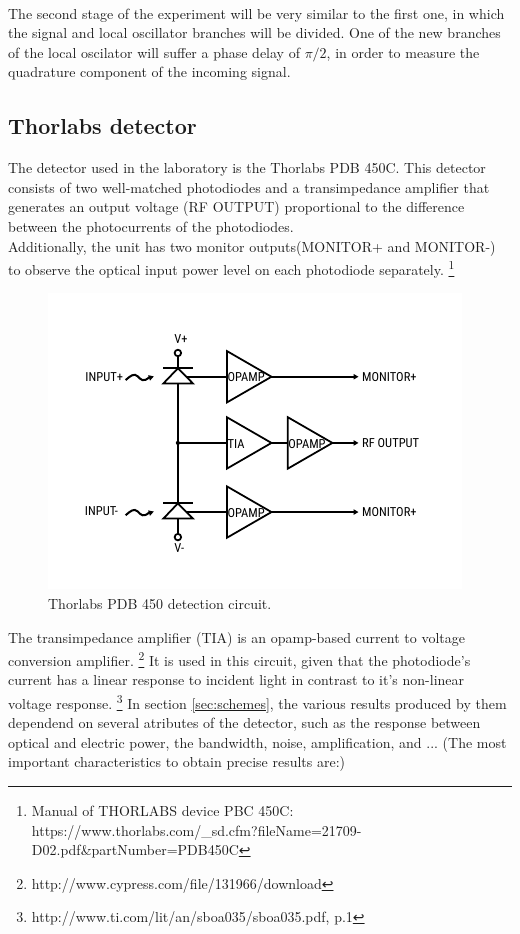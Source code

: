 \begin{bibunit}[plain]
\\
The second stage of the experiment will be very similar to the first one, in which the signal and local oscillator branches will be divided. One of the new branches of the local oscilator will suffer a phase delay of $\pi/2$, in order to measure the quadrature component of the incoming signal.\\
\subsection{Thorlabs detector}
The detector used in the laboratory is the Thorlabs PDB 450C. This detector consists of two well-matched photodiodes and a transimpedance amplifier that generates an output voltage (RF OUTPUT) proportional to the difference between the photocurrents of the photodiodes.\\
Additionally, the unit has two monitor outputs(MONITOR+ and MONITOR-) to observe the optical input power level on each photodiode separately.
\footnote{Manual of THORLABS device PBC 450C: https://www.thorlabs.com/\_sd.cfm?fileName=21709-D02.pdf\&partNumber=PDB450C}
%
\begin{figure}[H]
	\centering
	\includegraphics{./sdf/optical_detection/figures/thorlabs-circuit.pdf}
	\caption{Thorlabs PDB 450 detection circuit.}
\end{figure}
%
%
The transimpedance amplifier (TIA) is an opamp-based current to voltage conversion amplifier.
\footnote{http://www.cypress.com/file/131966/download}
It is used in this circuit, given that the photodiode's current has a linear response to incident light in contrast to it's non-linear voltage response.
\footnote{http://www.ti.com/lit/an/sboa035/sboa035.pdf, p.1}
%
In section \ref{sec:schemes}, the various results produced by them dependend on several atributes of the detector, such as the response between optical and electric power, the bandwidth, noise, amplification, and ...
(The most important characteristics to obtain precise results are:)


\end{bibunit}
